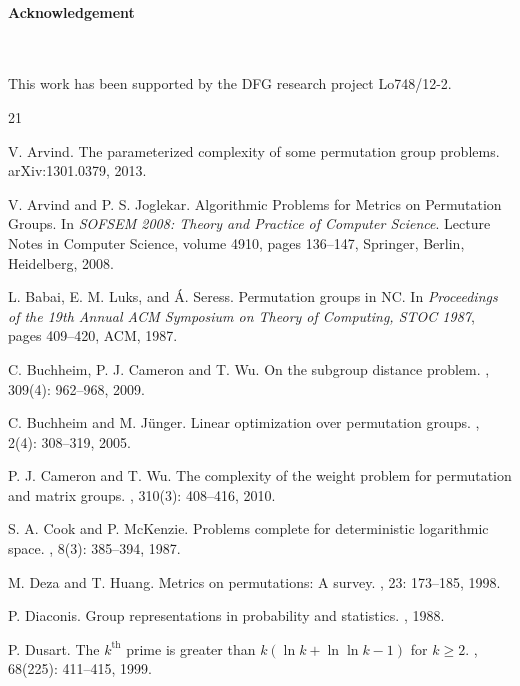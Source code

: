 \documentclass{article}
\begin{document}
\paragraph{Acknowledgement}~\bigskip

This work has been supported by the DFG research project Lo748/12-2.


\begin{thebibliography}{21}

V. Arvind.
\newblock The parameterized complexity of some permutation group problems.
\newblock arXiv:1301.0379, 2013.

V. Arvind and P. S. Joglekar.
\newblock Algorithmic Problems for Metrics on Permutation Groups.
\newblock In {\em SOFSEM 2008: Theory and Practice of Computer Science}. Lecture Notes in Computer Science, volume 4910, pages 136--147, Springer, Berlin, Heidelberg, 2008.

L. Babai, E. M. Luks, and {\'A}. Seress.
\newblock Permutation groups in NC.
\newblock In {\em Proceedings of the 19th Annual ACM Symposium on Theory of Computing, STOC 1987}, pages 409--420, ACM, 1987.

C. Buchheim, P. J. Cameron and T. Wu.
\newblock On the subgroup distance problem.
, 309(4): 962--968, 2009.

C. Buchheim and M. J\"unger.
\newblock Linear optimization over permutation groups.
, 2(4): 308--319, 2005.

P. J. Cameron and T. Wu.
\newblock The complexity of the weight problem for permutation and matrix groups.
, 310(3): 408--416, 2010.

S. A. Cook and P. McKenzie.
\newblock Problems complete for deterministic logarithmic space.
, 8(3): 385--394, 1987.

M. Deza and T. Huang.
\newblock Metrics on permutations: A survey.
, 23: 173--185, 1998.

P. Diaconis.
\newblock Group representations in probability and statistics.
, 1988.

P. Dusart.
\newblock The $k^{\text{th}}$ prime is greater than $k(\ln k+\ln\ln k-1)$ for $k \geq 2$.
, 68(225): 411--415, 1999.


\end{thebibliography}
\end{document}
